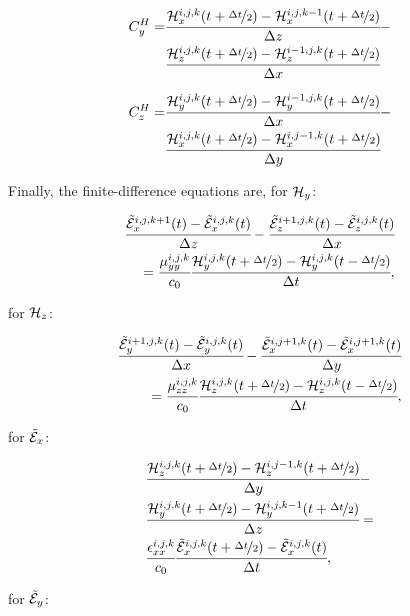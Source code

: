 \begin{eqnarray}
    C_y^H =& \cfrac{\mathcal{H}_x^{i, j, k}(t+\nicefrac{\Delta t}{2})-\mathcal{H}_x^{i, j, k-1}(t+\nicefrac{\Delta t}{2})}{\Delta z} - \nonumber \\ 
    \qquad & \cfrac{\mathcal{H}_z^{i, j, k}(t+\nicefrac{\Delta t}{2})-\mathcal{H}_z^{i-1, j, k}(t+\nicefrac{\Delta t}{2})}{\Delta x}
    \label{eq:CHy}
\end{eqnarray}


\begin{eqnarray}
    C_z^H =& \cfrac{\mathcal{H}_y^{i, j, k}(t+\nicefrac{\Delta t}{2})-\mathcal{H}_y^{i-1, j, k}(t+\nicefrac{\Delta t}{2})}{\Delta x} - \nonumber \\ 
    \qquad & \cfrac{\mathcal{H}_x^{i, j, k}(t+\nicefrac{\Delta t}{2})-\mathcal{H}_x^{i, j-1, k}(t+\nicefrac{\Delta t}{2})}{\Delta y}
    \label{eq:CHz}
\end{eqnarray}

Finally, the finite-difference equations are, for $\mathcal{H}_y$:

\begin{eqnarray}
    \cfrac{\tilde{\mathcal{E}}_x^{i, j, k+1}(t)-\tilde{\mathcal{E}}_x^{i, j, k}(t)}{\Delta z} - \cfrac{\tilde{\mathcal{E}}_z^{i+1, j, k}(t)-\tilde{\mathcal{E}}_z^{i, j, k}(t)}{\Delta x} \nonumber \\ 
    =\cfrac{\mu_{yy}^{i,j,k}}{c_0}\cfrac{\mathcal{H}_y^{i,j,k}(t+\nicefrac{\Delta t}{2}) - \mathcal{H}_y^{i,j,k}(t-\nicefrac{\Delta t}{2})}{\Delta t},
    \label{eq:fd_hy}
\end{eqnarray}

for $\mathcal{H}_z$:

\begin{eqnarray}
    \cfrac{\tilde{\mathcal{E}}_y^{i+1, j, k}(t)-\tilde{\mathcal{E}}_y^{i, j, k}(t)}{\Delta x} - \cfrac{\tilde{\mathcal{E}}_x^{i, j+1, k}(t)-\tilde{\mathcal{E}}_x^{i, j+1, k}(t)}{\Delta y} \nonumber \\
    =\cfrac{\mu_{zz}^{i,j,k}}{c_0}\cfrac{\mathcal{H}_z^{i,j,k}(t+\nicefrac{\Delta t}{2}) - \mathcal{H}_z^{i,j,k}(t-\nicefrac{\Delta t}{2})}{\Delta t},
    \label{eq:fd_hz}
\end{eqnarray}

for $\tilde{\mathcal{E}}_x$:

\begin{eqnarray}
    &\cfrac{\mathcal{H}_z^{i, j, k}(t+\nicefrac{\Delta t}{2})-\mathcal{H}_z^{i, j-1, k}(t+\nicefrac{\Delta t}{2})}{\Delta y} - \nonumber\\ 
    & \cfrac{\mathcal{H}_y^{i, j, k}(t+\nicefrac{\Delta t}{2})-\mathcal{H}_y^{i, j, k-1}(t+\nicefrac{\Delta t}{2})}{\Delta z} = \nonumber\\
    &\cfrac{\epsilon_{xx}^{i,j,k}}{c_0}\cfrac{\tilde{\mathcal{E}}_x^{i,j,k}(t+\nicefrac{\Delta t}{2})-\tilde{\mathcal{E}}_x^{i,j,k}(t)}{\Delta t},
    \label{eq:fd_ex}
\end{eqnarray}

for $\tilde{\mathcal{E}}_y$:

